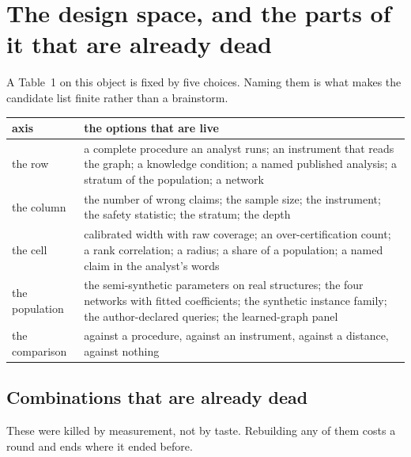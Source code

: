 \section{The design space, and the parts of it that are already dead}

A Table~1 on this object is fixed by five choices. Naming them is what makes the candidate list
finite rather than a brainstorm.

\begin{center}\footnotesize
\begin{tabular}{@{}p{2.5cm}p{13.85cm}@{}}
\toprule
axis & the options that are live \\
\midrule
the row & a complete procedure an analyst runs; an instrument that reads the graph; a knowledge
condition; a named published analysis; a stratum of the population; a network \\
the column & the number of wrong claims; the sample size; the instrument; the safety statistic; the
stratum; the depth \\
the cell & calibrated width with raw coverage; an over-certification count; a rank correlation; a
radius; a share of a population; a named claim in the analyst's words \\
the population & the semi-synthetic parameters on real structures; the four networks with fitted
coefficients; the synthetic instance family; the author-declared queries; the learned-graph panel \\
the comparison & against a procedure, against an instrument, against a distance, against nothing \\
\bottomrule
\end{tabular}
\end{center}

\subsection{Combinations that are already dead}

These were killed by measurement, not by taste. Rebuilding any of them costs a round and ends where
it ended before.

